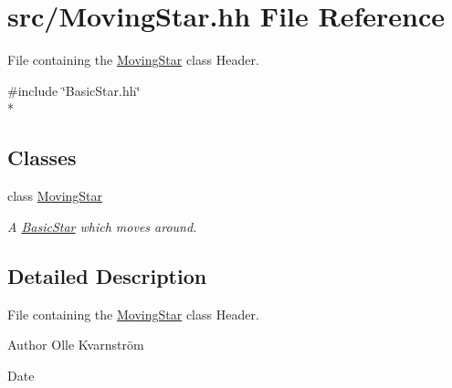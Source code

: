 \hypertarget{MovingStar_8hh}{\section{src/\-Moving\-Star.hh File Reference}
\label{MovingStar_8hh}
}


File containing the \hyperlink{classMovingStar}{Moving\-Star} class Header.  


{\ttfamily \#include \char`\"{}Basic\-Star.\-hh\char`\"{}}\\*
\subsection*{Classes}
\begin{DoxyCompactItemize}
\item 
class \hyperlink{classMovingStar}{Moving\-Star}
\begin{DoxyCompactList}\small\item\em A \hyperlink{classBasicStar}{Basic\-Star} which moves around. \end{DoxyCompactList}\end{DoxyCompactItemize}


\subsection{Detailed Description}
File containing the \hyperlink{classMovingStar}{Moving\-Star} class Header. \begin{DoxyAuthor}{Author}
Olle Kvarnström 
\end{DoxyAuthor}
\begin{DoxyDate}{Date}

\end{DoxyDate}
